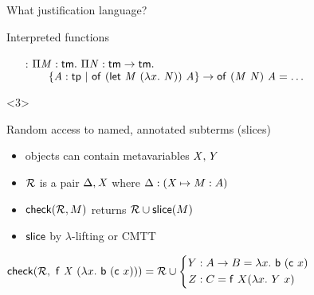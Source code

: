 \documentclass{beamer}
\theoremstyle{example}
\begin{document}
\begin{frame}{What justification language?}
\begin{overlayarea}
\begin{onlyenv}
\begin{block}{Interpreted functions}
\begin{example}
\begin{enumerate}[inline]
          \item[\const{inline} :] $\Pi{\ensuremath{\text{\textit{M}}}}:{\text{\textsf{tm}}}.\  \Pi{\ensuremath{\text{\textit{N}}}}:{\text{\textsf{tm}}\to\text{\textsf{tm}}}.\  $\\ $\qquad \{{\text{\textit{A}}}:{\text{\textsf{tp}}}\ |\ {{\text{\textsf{of}}}\  {(\text{\textsf{let}}\ {\text{\textit{M}}}\ {(\lambda{x}.\  \text{\textit{N}})})}\  {\text{\textit{A}}}}\} \to
            {\ensuremath{\text{\textsf{of}}}}\  {({\text{\textit{M}}}\  {\text{\textit{N}}})}\  {\text{\textit{A}}} =
            \ldots$
          \end{enumerate}
        \end{example}
      \end{block}
    \end{onlyenv}
    \begin{onlyenv}<3>
      \begin{block}
        {Random access} to named, annotated subterms (slices) \\
        \begin{itemize}
        \item objects can contain metavariables $\text{\textit{X}}, \text{\textit{Y}}$
        \item $\mathcal{R}$ is a pair $\Delta, \text{\textit{X}}$ where $\Delta :
          (\text{\textit{X}}\mapsto M : A)$
        \item ${\rm\mathsf{check}}({\mathcal{R}, M})$ returns $\mathcal{R} \cup {\rm\mathsf{slice}}({M})$
        \item ${\rm\mathsf{slice}}$ by $\lambda$-lifting or CMTT
        \end{itemize}
        \begin{example}
          \begin{math}
            {\rm\mathsf{check}}({\mathcal{R},\ \text{\textsf{f}}\ \text{\textit{X}}\ (\lambda{x}.\  \text{\textsf{b}}\ (\text{\textsf{c}}\ x))}) = \mathcal{R} \cup \left\{
              \begin{aligned}
                Y &: A\to B = \lambda{x}.\  \text{\textsf{b}}\ (\text{\textsf{c}}\ x) \\
                Z &: C = \text{\textsf{f}}\ X (\lambda{x}.\  Y\ x)
              \end{aligned}
            \right.
          \end{math}
        \end{example}
      \end{block}
      \end{onlyenv}
    \end{overlayarea}

\end{frame}
\end{document}

